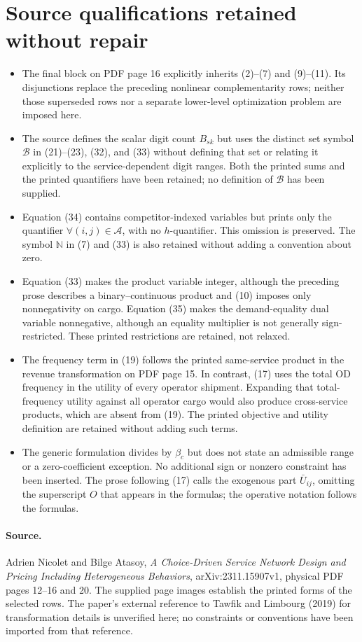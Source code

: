 \documentclass{article}
\begin{document}
\section*{Source qualifications retained without repair}
\begin{itemize}
\item The final block on PDF page 16 explicitly inherits (2)--(7) and (9)--(11). Its disjunctions replace the preceding nonlinear complementarity rows; neither those superseded rows nor a separate lower-level optimization problem are imposed here.
\item The source defines the scalar digit count \(B_{sk}\) but uses the distinct set symbol \(\mathcal B\) in (21)--(23), (32), and (33) without defining that set or relating it explicitly to the service-dependent digit ranges. Both the printed sums and the printed quantifiers have been retained; no definition of \(\mathcal B\) has been supplied.
\item Equation (34) contains competitor-indexed variables but prints only the quantifier \(\forall(i,j)\in\mathcal A\), with no \(h\)-quantifier. This omission is preserved. The symbol \(\mathbb N\) in (7) and (33) is also retained without adding a convention about zero.
\item Equation (33) makes the product variable integer, although the preceding prose describes a binary--continuous product and (10) imposes only nonnegativity on cargo. Equation (35) makes the demand-equality dual variable nonnegative, although an equality multiplier is not generally sign-restricted. These printed restrictions are retained, not relaxed.
\item The frequency term in (19) follows the printed same-service product in the revenue transformation on PDF page 15. In contrast, (17) uses the total OD frequency in the utility of every operator shipment. Expanding that total-frequency utility against all operator cargo would also produce cross-service products, which are absent from (19). The printed objective and utility definition are retained without adding such terms.
\item The generic formulation divides by \(\beta_c\) but does not state an admissible range or a zero-coefficient exception. No additional sign or nonzero constraint has been inserted. The prose following (17) calls the exogenous part \(\bar U_{ij}\), omitting the superscript \(O\) that appears in the formulas; the operative notation follows the formulas.
\end{itemize}

\paragraph{Source.}
Adrien Nicolet and Bilge Atasoy, \emph{A Choice-Driven Service Network Design and Pricing Including Heterogeneous Behaviors}, arXiv:2311.15907v1, physical PDF pages 12--16 and 20. The supplied page images establish the printed forms of the selected rows. The paper's external reference to Tawfik and Limbourg (2019) for transformation details is unverified here; no constraints or conventions have been imported from that reference.
\end{document}

